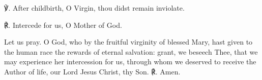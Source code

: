 \begin{enpars}


℣. After childbirth, O Virgin, thou didst remain inviolate.

℟. Intercede for us, O Mother of God.

Let us pray. O God, who by the fruitful virginity of blessed Mary, hast given to the human race the rewards of eternal salvation: grant, we beseech Thee, that we may experience her intercession for us, through whom we deserved to receive the Author of life, our Lord Jesus Christ, thy Son. ℟. Amen.
\end{enpars}